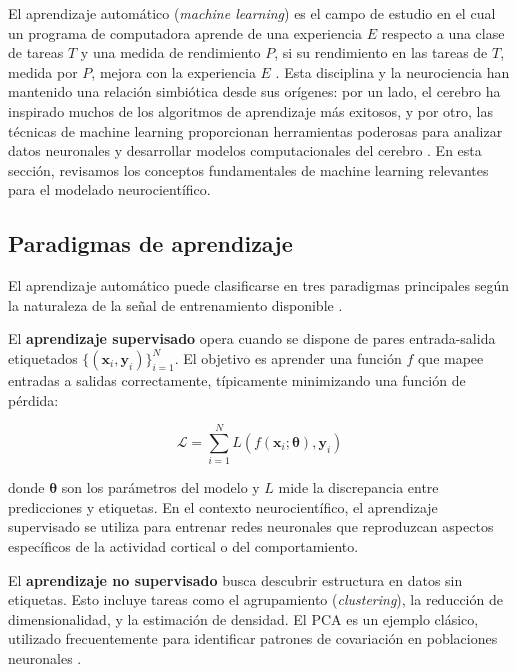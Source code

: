 El aprendizaje automático (\textit{machine learning}) es el campo de estudio en el cual un programa de computadora aprende de una experiencia $E$ respecto a una clase de tareas $T$ y una medida de rendimiento $P$, si su rendimiento en las tareas de $T$, medida por $P$, mejora con la experiencia $E$ \citep{mitchell1997machine}. Esta disciplina y la neurociencia han mantenido una relación simbiótica desde sus orígenes: por un lado, el cerebro ha inspirado muchos de los algoritmos de aprendizaje más exitosos, y por otro, las técnicas de machine learning proporcionan herramientas poderosas para analizar datos neuronales y desarrollar modelos computacionales del cerebro \citep{heaton2018ian}. En esta sección, revisamos los conceptos fundamentales de machine learning relevantes para el modelado neurocientífico.

\subsection{Paradigmas de aprendizaje}
\label{subsec:paradigmas_aprendizaje}

El aprendizaje automático puede clasificarse en tres paradigmas principales según la naturaleza de la señal de entrenamiento disponible \citep{bishop2006pattern, murphy2012machine}.

El \textbf{aprendizaje supervisado} opera cuando se dispone de pares entrada-salida etiquetados $\{(\mathbf{x}_i, \mathbf{y}_i)\}_{i=1}^N$. El objetivo es aprender una función $f$ que mapee entradas a salidas correctamente, típicamente minimizando una función de pérdida:

\begin{equation}
\mathcal{L} = \sum_{i=1}^N L(f(\mathbf{x}_i; \boldsymbol{\theta}), \mathbf{y}_i)
\label{eq:supervised_loss}
\end{equation}

donde $\boldsymbol{\theta}$ son los parámetros del modelo y $L$ mide la discrepancia entre predicciones y etiquetas. En el contexto neurocientífico, el aprendizaje supervisado se utiliza para entrenar redes neuronales que reproduzcan aspectos específicos de la actividad cortical o del comportamiento.

El \textbf{aprendizaje no supervisado} busca descubrir estructura en datos sin etiquetas. Esto incluye tareas como el agrupamiento (\textit{clustering}), la reducción de dimensionalidad, y la estimación de densidad. El \acrfull{PCA} es un ejemplo clásico, utilizado frecuentemente para identificar patrones de covariación en poblaciones neuronales \citep{bishop2006pattern}.

